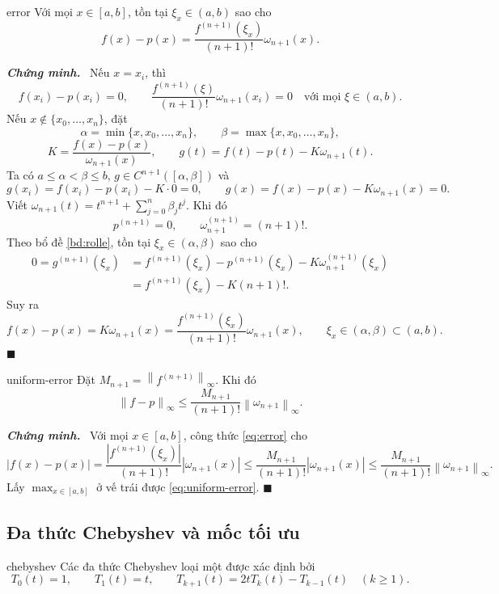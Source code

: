\documentclass[12pt,a4paper,oneside]{book}
\numberwithin{algorithm}{chapter}
\theoremstyle{definition}
\newenvironment{chungminh}{\par\medskip\noindent\textbf{\textit{\color{mainblue}Chứng minh.}}\ }{\hfill$\blacksquare$\par\medskip}
\newcommand{\norminf}[1]{\left\lVert #1\right\rVert_{\infty}}
\begin{document}
\begin{dinhly}{}{error}
Với mọi $x\in[a,b]$, tồn tại $\xi_x\in(a,b)$ sao cho
\begin{equation}\label{eq:error}
 f(x)-p(x)=\frac{f^{(n+1)}(\xi_x)}{(n+1)!}\omega_{n+1}(x).
\end{equation}
\end{dinhly}
\begin{chungminh}
Nếu $x=x_i$, thì
\[
 f(x_i)-p(x_i)=0,\qquad
 \frac{f^{(n+1)}(\xi)}{(n+1)!}\omega_{n+1}(x_i)=0
 \quad\text{với mọi }\xi\in(a,b).
\]
Nếu $x\notin\{x_0,\ldots,x_n\}$, đặt
\[
 \alpha=\min\{x,x_0,\ldots,x_n\},\qquad
 \beta=\max\{x,x_0,\ldots,x_n\},
\]
\[
 K=\frac{f(x)-p(x)}{\omega_{n+1}(x)},\qquad
 g(t)=f(t)-p(t)-K\omega_{n+1}(t).
\]
Ta có $a\leq\alpha<\beta\leq b$, $g\in C^{n+1}([\alpha,\beta])$ và
\[
 g(x_i)=f(x_i)-p(x_i)-K\cdot0=0,
 \qquad g(x)=f(x)-p(x)-K\omega_{n+1}(x)=0.
\]
Viết $\omega_{n+1}(t)=t^{n+1}+\sum_{j=0}^{n}\beta_jt^j$. Khi đó
\[
 p^{(n+1)}=0,\qquad
 \omega_{n+1}^{(n+1)}=(n+1)!.
\]
Theo bổ đề \ref{bd:rolle}, tồn tại $\xi_x\in(\alpha,\beta)$ sao cho
\begin{align*}
 0=g^{(n+1)}(\xi_x)
 &=f^{(n+1)}(\xi_x)-p^{(n+1)}(\xi_x)
   -K\omega_{n+1}^{(n+1)}(\xi_x)\\
 &=f^{(n+1)}(\xi_x)-K(n+1)!.
\end{align*}
Suy ra
\[
 f(x)-p(x)=K\omega_{n+1}(x)
 =\frac{f^{(n+1)}(\xi_x)}{(n+1)!}\omega_{n+1}(x),
 \qquad\xi_x\in(\alpha,\beta)\subset(a,b).
\]
\end{chungminh}

\begin{hequa}{}{uniform-error}
Đặt $M_{n+1}=\norminf{f^{(n+1)}}$. Khi đó
\begin{equation}\label{eq:uniform-error}
 \norminf{f-p}\leq\frac{M_{n+1}}{(n+1)!}\norminf{\omega_{n+1}}.
\end{equation}
\end{hequa}
\begin{chungminh}
Với mọi $x\in[a,b]$, công thức \eqref{eq:error} cho
\[
 |f(x)-p(x)|
 =\frac{|f^{(n+1)}(\xi_x)|}{(n+1)!}|\omega_{n+1}(x)|
 \leq\frac{M_{n+1}}{(n+1)!}|\omega_{n+1}(x)|
 \leq\frac{M_{n+1}}{(n+1)!}\norminf{\omega_{n+1}}.
\]
Lấy $\max_{x\in[a,b]}$ ở vế trái được \eqref{eq:uniform-error}.
\end{chungminh}

\subsection{Đa thức Chebyshev và mốc tối ưu}
\begin{dinhnghia}{}{chebyshev}
Các đa thức Chebyshev loại một được xác định bởi
\begin{equation}\label{eq:chebyshev-rec}
 T_0(t)=1,\qquad T_1(t)=t,\qquad
 T_{k+1}(t)=2tT_k(t)-T_{k-1}(t)\quad(k\geq1).
\end{equation}
\end{dinhnghia}
\end{document}
